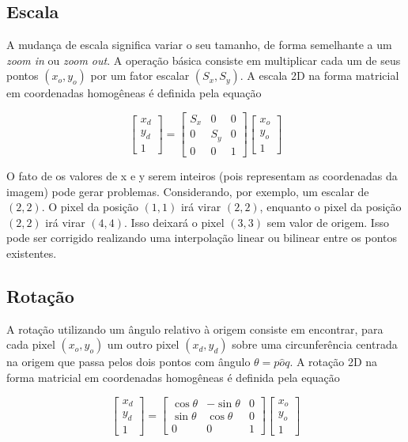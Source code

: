\documentclass[12pt,oneside,a4paper,english,french,spanish,brazil,]{abntex2}
\begin{document}
\subsection{Escala}

A mudança de escala significa variar o seu tamanho, de forma semelhante a um \textit{zoom in} ou \textit{zoom out}. A operação básica consiste em multiplicar cada um de seus pontos \((x_o,y_o)\) por um fator escalar \((S_x,S_y)\). A escala 2D na forma matricial em coordenadas homogêneas é definida pela equação

\[
\begin{bmatrix}
x_d\\ 
y_d\\ 
1
\end{bmatrix}
=
\begin{bmatrix}
S_x & 0 & 0\\ 
0 & S_y & 0\\ 
0 & 0 & 1
\end{bmatrix}
\begin{bmatrix}
x_o\\ 
y_o\\ 
1
\end{bmatrix}
\]

O fato de os valores de x e y serem inteiros (pois representam as coordenadas da imagem) pode gerar problemas. Considerando, por exemplo, um escalar de \((2,2)\). O pixel da posição \((1,1)\) irá virar \((2,2)\), enquanto o pixel da posição \((2,2)\) irá virar \((4,4)\). Isso deixará o pixel \((3,3)\) sem valor de origem. Isso pode ser corrigido realizando uma interpolação linear ou bilinear entre os pontos existentes.

\subsection{Rotação}

A rotação utilizando um ângulo  relativo à origem consiste em encontrar, para cada pixel \((x_o,y_o)\) um outro pixel \((x_d,y_d)\) sobre uma circunferência centrada na origem que passa pelos dois pontos com ângulo \(\theta=p \hat{o} q\). A rotação 2D na forma matricial em coordenadas homogêneas é definida pela equação



\[
\begin{bmatrix}
x_d\\ 
y_d\\ 
1
\end{bmatrix}
=
\begin{bmatrix}
\cos{\theta} & -\sin{\theta} & 0\\ 
\sin{\theta} & \cos{\theta} & 0\\ 
0 & 0 & 1
\end{bmatrix}
\begin{bmatrix}
x_o\\ 
y_o\\ 
1
\end{bmatrix}
\]
\end{document}
